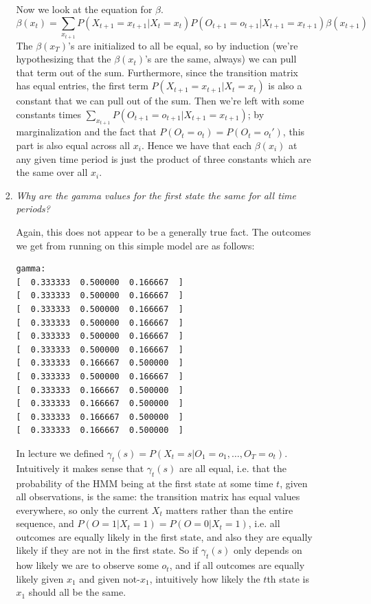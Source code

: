 \documentclass{article}
\begin{document}
\begin{enumerate}[(a)]
\begin{enumerate}
\begin{enumerate}[(1)]
      Now we look at the equation for $\beta$.
      \[\beta(x_t)=\sum_{x_{t+1}} P(X_{t+1}=x_{t+1}|X_t=x_t)P(O_{t+1}=o_{t+1}|X_{t+1}=x_{t+1})\beta (x_{t+1})\]
      The $\beta(x_T)$'s are initialized to all be equal, so by
      induction (we're hypothesizing that the $\beta(x_t)$'s are the
      same, always) we can pull that term out of the sum. Furthermore,
      since the transition matrix has equal entries, the first term
      $P(X_{t+1}=x_{t+1}|X_t=x_t)$ is also a constant that we can pull
      out of the sum. Then we're left with some constants times
      $\sum_{x_{t+1}} P(O_{t+1}=o_{t+1}|X_{t+1}=x_{t+1})$; by
      marginalization and the fact that $P(O_t=o_t)=P(O_t=o_t')$, this
      part is also equal across all $x_i$. Hence we have that each
      $\beta(x_i)$ at any given time period is just the product of three
      constants which are the same over all $x_i$.


    \item \emph{Why are the gamma values for the first state the same for all time periods?}

      Again, this does not appear to be a generally true fact. The outcomes
      we get from running on this simple model are as follows:

\begin{verbatim}
gamma:
[  0.333333  0.500000  0.166667  ]
[  0.333333  0.500000  0.166667  ]
[  0.333333  0.500000  0.166667  ]
[  0.333333  0.500000  0.166667  ]
[  0.333333  0.500000  0.166667  ]
[  0.333333  0.500000  0.166667  ]
[  0.333333  0.166667  0.500000  ]
[  0.333333  0.500000  0.166667  ]
[  0.333333  0.166667  0.500000  ]
[  0.333333  0.166667  0.500000  ]
[  0.333333  0.166667  0.500000  ]
[  0.333333  0.166667  0.500000  ]
\end{verbatim}

      In lecture we defined $\gamma_t(s)=P(X_t=s|O_1=o_1,\ldots,O_T=o_t)$.
      Intuitively it makes sense that $\gamma_t(s)$ are all equal, i.e. that
      the probability of the HMM being at the first state at some time $t$,
      given all observations, is the same: the transition matrix has equal
      values everywhere, so only the current $X_t$ matters rather than the
      entire sequence, and $P(O=1|X_t=1)=P(O=0|X_t=1)$, i.e. all outcomes
      are equally likely in the first state, and also they are equally likely
      if they are not in the first state. So if $\gamma_t(s)$ only depends
      on how likely we are to observe some $o_t$, and if all outcomes are
      equally likely given $x_1$ and given not-$x_1$, intuitively how likely
      the $t$th state is $x_1$ should all be the same.


\end{enumerate}
\end{enumerate}
\end{enumerate}
\end{document}
